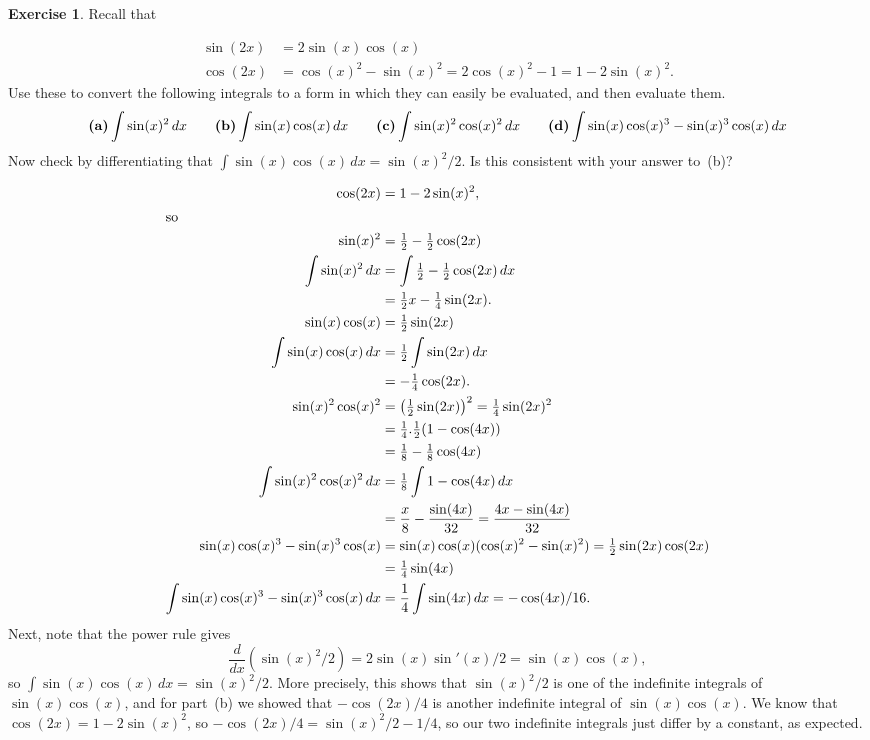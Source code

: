 \documentclass[a4paper]{amsart}
\theoremstyle{definition}
\newtheorem{exercise}{Exercise}[section]
\newenvironment{solution}{{\noindent \bf Solution:}}{}
\begin{document}
\begin{exercise}\label{ex-int-trig}
Recall that 

 \vspace{-5ex}
 \begin{align*}
  \sin(2x) &= 2\sin(x)\cos(x) \\
  \cos(2x) &= \cos(x)^2-\sin(x)^2
            = 2\cos(x)^2-1 = 1-2\sin(x)^2. 
 \end{align*}
 Use these to convert the following integrals to a form in
 which they can easily be evaluated, and then evaluate them.
 \[
  \text{\bf (a)} \int\sin(x)^2\,dx \hspace{2em}
  \text{\bf (b)} \int\sin(x)\cos(x)\,dx \hspace{2em}
  \text{\bf (c)} \int\sin(x)^2\cos(x)^2\,dx \hspace{2em}
  \text{\bf (d)} \int\sin(x)\cos(x)^3-\sin(x)^3\cos(x)\,dx
 \]
 Now check by differentiating that
 $\int\sin(x)\cos(x)\,dx=\sin(x)^2/2$.  Is this consistent
 with your answer to~(b)?
\end{exercise}
\begin{solution}
\begin{align*}
  \cos(2x) &= 1-2\sin(x)^2, \\
 \intertext{so}
  \sin(x)^2 &= \tfrac{1}{2} - \tfrac{1}{2}\cos(2x) \\
  \int \sin(x)^2 \,dx &=
   \int \tfrac{1}{2} - \tfrac{1}{2}\cos(2x) \,dx \\
   &= \tfrac{1}{2}x - \tfrac{1}{4}\sin(2x). \\
  \sin(x)\cos(x) &= \tfrac{1}{2}\sin(2x) \\
  \int\sin(x)\cos(x)\,dx &= \tfrac{1}{2}\int\sin(2x)\,dx \\
    &= -\tfrac{1}{4}\cos(2x). \\
  \sin(x)^2\cos(x)^2 &= \left(\tfrac{1}{2}\sin(2x)\right)^2
                      = \tfrac{1}{4}\sin(2x)^2 \\
    &= \tfrac{1}{4}.\tfrac{1}{2}(1-\cos(4x)) \\
    &= \tfrac{1}{8} - \tfrac{1}{8}\cos(4x) \\
   \int \sin(x)^2\cos(x)^2\, dx &=
    \tfrac{1}{8} \int 1-\cos(4x)\, dx  \\
    &= \frac{x}{8} - \frac{\sin(4x)}{32} = \frac{4x-\sin(4x)}{32} \\
  \sin(x)\cos(x)^3-\sin(x)^3\cos(x) &=
   \sin(x)\cos(x)(\cos(x)^2-\sin(x)^2) =
   \tfrac{1}{2}\sin(2x)\cos(2x) \\
   &= \tfrac{1}{4}\sin(4x) \\
  \int \sin(x)\cos(x)^3-\sin(x)^3\cos(x)\,dx &=
   \frac{1}{4}\int\sin(4x)\,dx = -\cos(4x)/16.
 \end{align*}
 Next, note that the power rule gives
 \[ \frac{d}{dx}(\sin(x)^2/2) = 
     2\sin(x)\sin'(x)/2 = \sin(x)\cos(x),
 \]
 so $\int\sin(x)\cos(x)\,dx=\sin(x)^2/2$.  More precisely,
 this shows that $\sin(x)^2/2$ is one of the indefinite
 integrals of $\sin(x)\cos(x)$, and for part~(b) we showed
 that $-\cos(2x)/4$ is another indefinite integral of
 $\sin(x)\cos(x)$.  We know that $\cos(2x)=1-2\sin(x)^2$, so
 $-\cos(2x)/4=\sin(x)^2/2-1/4$, so our two indefinite
 integrals just differ by a constant, as expected.
\end{solution}
\end{document}

